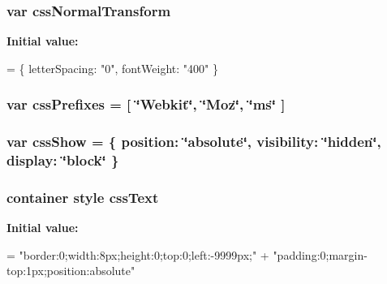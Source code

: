 \subsubsection[{\texorpdfstring{css\+Normal\+Transform}{cssNormalTransform}}]{\setlength{\rightskip}{0pt plus 5cm}var css\+Normal\+Transform}\hypertarget{jquery-3_82_81_8js_a6674465ca49f03858aec8237d92ad001}{}\label{jquery-3_82_81_8js_a6674465ca49f03858aec8237d92ad001}
{\bfseries Initial value\+:}
\begin{DoxyCode}
= \{
        letterSpacing: \textcolor{stringliteral}{"0"},
        fontWeight: \textcolor{stringliteral}{"400"}
    \}
\end{DoxyCode}
\subsubsection[{\texorpdfstring{css\+Prefixes}{cssPrefixes}}]{\setlength{\rightskip}{0pt plus 5cm}var css\+Prefixes = \mbox{[} \char`\"{}Webkit\char`\"{}, \char`\"{}Moz\char`\"{}, \char`\"{}ms\char`\"{} \mbox{]}}\hypertarget{jquery-3_82_81_8js_aa1d774f23376bc71c9644072114c9c8c}{}\label{jquery-3_82_81_8js_aa1d774f23376bc71c9644072114c9c8c}
\subsubsection[{\texorpdfstring{css\+Show}{cssShow}}]{\setlength{\rightskip}{0pt plus 5cm}var css\+Show = \{ position\+: \char`\"{}absolute\char`\"{}, visibility\+: \char`\"{}hidden\char`\"{}, display\+: \char`\"{}block\char`\"{} \}}\hypertarget{jquery-3_82_81_8js_a2b4645641dc8710f01a9fc6cb72dfb2a}{}\label{jquery-3_82_81_8js_a2b4645641dc8710f01a9fc6cb72dfb2a}
\subsubsection[{\texorpdfstring{css\+Text}{cssText}}]{\setlength{\rightskip}{0pt plus 5cm}container style css\+Text}\hypertarget{jquery-3_82_81_8js_a4629b18ca428e3849d3fdc36db6eb33b}{}\label{jquery-3_82_81_8js_a4629b18ca428e3849d3fdc36db6eb33b}
{\bfseries Initial value\+:}
\begin{DoxyCode}
= \textcolor{stringliteral}{"border:0;width:8px;height:0;top:0;left:-9999px;"} +
        \textcolor{stringliteral}{"padding:0;margin-top:1px;position:absolute"}
\end{DoxyCode}
